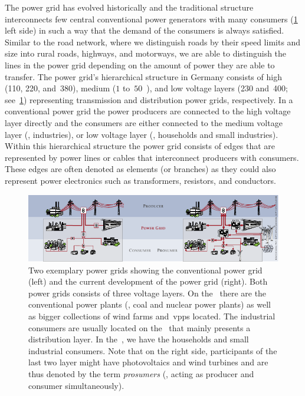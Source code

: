 The power grid has evolved historically and the traditional structure
interconnects few central conventional power generators with many consumers
(\cref{ch:intro:fig:power-grid-structure} left side) in such a way that the
demand of the consumers is always satisfied. Similar to the road network, where
we distinguish roads by their speed limits and size into rural roads, highways,
and motorways, we are able to distinguish the lines in the power grid depending
on the amount of power they are able to transfer. The power grid's hierarchical
structure in Germany consists of high (\SI{110}{}, \SI{220}{
}, and~\SI{380}{}), medium ($1$
to~$50$~), and low voltage layers (\SI{230}{}
and~\SI{400}{}; see~\cref{ch:intro:fig:power-grid-structure})
representing transmission and distribution power grids, respectively. In a
conventional power grid the power producers are connected to the high voltage
layer directly and the consumers are either connected to the medium voltage
layer (\eg, industries), or low voltage layer (\eg, households and small
industries). Within this hierarchical structure the power grid consists of edges
that are represented by power lines or cables that interconnect producers with
consumers. These edges are often denoted as elements (or branches) as they could
also represent power electronics such as transformers, resistors, and
conductors.
%  
\begin{figure}[t!]
    \includegraphics{intro/fig/power-grid-structure.pdf}%
    \caption[Change of the power grid hierarchical structure.]{Two exemplary
    power grids showing the conventional power grid (left) and the current
    development of the power grid (right). Both power grids consists of three
    voltage layers. On the~ there are the
    conventional power plants (\eg, coal and nuclear power plants) as well as
    bigger collections of wind farms and~\acrlong{vpp}s located. The industrial
    consumers are usually located on the~ that mainly presents a distribution layer. In
    the~, we have the households and small
    industrial consumers. Note that on the right side, participants of the last
    two layer might have photovoltaics and wind turbines and are thus denoted by
    the term \emph{prosumers} (\ie, acting as producer and consumer
    simultaneously).%
    }%
    \label{ch:intro:fig:power-grid-structure}%
\end{figure} 

